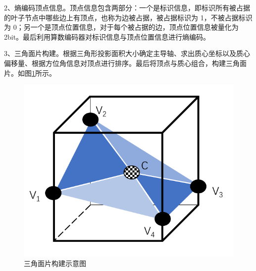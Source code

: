 \documentclass[bachelor,print,msfonts]{xduthesis}
\begin{document}
2、熵编码顶点信息。顶点信息包含两部分：一个是标识信息，即标识所有被占据的叶子节点中哪些边上有顶点，也称为边被占据，被占据标识为 1，不被占据标识为 0；另一个是顶点位置信息，对于每个被占据的边，顶点位置信息被量化为 2bit。最后利用算数编码器对标识信息与顶点位置信息进行熵编码。

3、三角面片构建。根据三角形投影面积大小确定主导轴、求出质心坐标以及质心偏移量、根据方位角信息对顶点进行排序。最后将顶点与质心组合，构建三角面片。如图\ref{fig:三角面片构建}所示。
\begin{figure}[h]
    \centering
    \includegraphics[scale=0.5]{image/三角面片构建v2.pdf}
    \caption{三角面片构建示意图}
    \label{fig:三角面片构建}
\end{figure}
\end{document}
